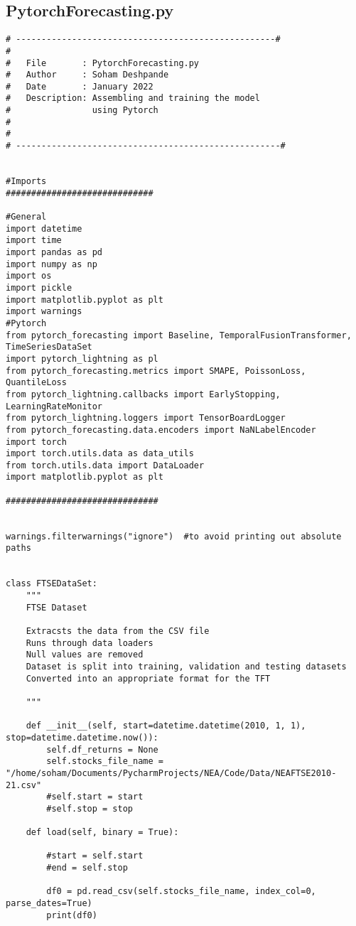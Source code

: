 \documentclass{article}
\begin{document}
\clearpage

\subsection{PytorchForecasting.py}
\begin{lstlisting}
# ---------------------------------------------------#
#
#   File       : PytorchForecasting.py
#   Author     : Soham Deshpande
#   Date       : January 2022
#   Description: Assembling and training the model
#                using Pytorch
#
#
# ----------------------------------------------------#


#Imports
#############################

#General
import datetime
import time
import pandas as pd
import numpy as np
import os
import pickle
import matplotlib.pyplot as plt
import warnings
#Pytorch
from pytorch_forecasting import Baseline, TemporalFusionTransformer, TimeSeriesDataSet
import pytorch_lightning as pl
from pytorch_forecasting.metrics import SMAPE, PoissonLoss, QuantileLoss
from pytorch_lightning.callbacks import EarlyStopping, LearningRateMonitor
from pytorch_lightning.loggers import TensorBoardLogger
from pytorch_forecasting.data.encoders import NaNLabelEncoder
import torch
import torch.utils.data as data_utils
from torch.utils.data import DataLoader
import matplotlib.pyplot as plt

##############################


warnings.filterwarnings("ignore")  #to avoid printing out absolute paths


class FTSEDataSet:
    """
    FTSE Dataset

    Extracsts the data from the CSV file
    Runs through data loaders
    Null values are removed
    Dataset is split into training, validation and testing datasets
    Converted into an appropriate format for the TFT

    """

    def __init__(self, start=datetime.datetime(2010, 1, 1), stop=datetime.datetime.now()):
        self.df_returns = None
        self.stocks_file_name = "/home/soham/Documents/PycharmProjects/NEA/Code/Data/NEAFTSE2010-21.csv"
        #self.start = start
        #self.stop = stop

    def load(self, binary = True):

        #start = self.start
        #end = self.stop

        df0 = pd.read_csv(self.stocks_file_name, index_col=0, parse_dates=True)
        print(df0)



\end{lstlisting}
\end{document}
